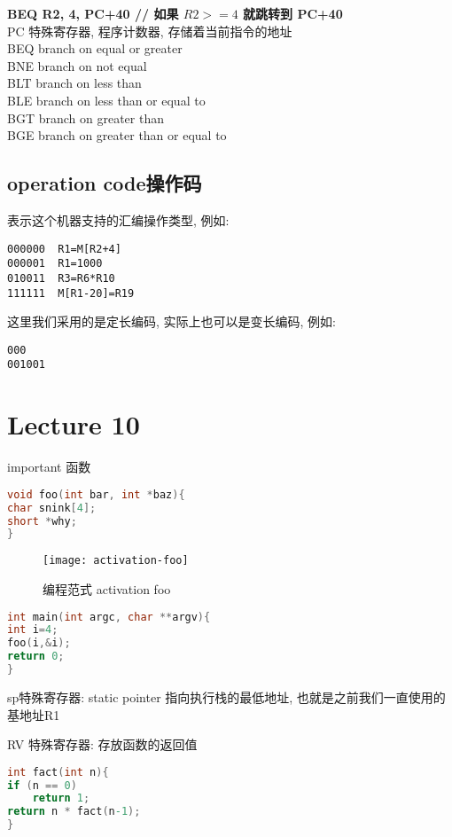 \documentclass{article}
\begin{document}
\bigskip\noindent
\textbf{BEQ R2, 4,  PC+40  // 如果 $R2 >=4$ 就跳转到 PC+40}\\
PC 特殊寄存器, 程序计数器, 存储着当前指令的地址\\
BEQ  branch on equal or greater\\
BNE branch on not equal\\
BLT branch on less than\\
BLE branch on less than or equal to\\
BGT branch on greater than\\
BGE branch on greater than or equal to\\

\subsection{operation code操作码}
表示这个机器支持的汇编操作类型,
例如:
\begin{verbatim}
000000	R1=M[R2+4]
000001	R1=1000
010011	R3=R6*R10
111111	M[R1-20]=R19
\end{verbatim}
这里我们采用的是定长编码,
实际上也可以是变长编码,
例如:
\begin{verbatim}
000
001001
\end{verbatim}

\section{Lecture 10} important
函数
\begin{lstlisting}[language = C]
void foo(int bar, int *baz){
char snink[4];
short *why;
}
\end{lstlisting}
\begin{figure}[htbp]
	\centering
	\texttt{[image: activation-foo]}\\
	\caption{编程范式 activation foo}\label{fig.activation.foo}
\end{figure}


\begin{lstlisting}[language = C]
int main(int argc, char **argv){
int i=4;
foo(i,&i);
return 0;
}
\end{lstlisting}

sp特殊寄存器:
static pointer 指向执行栈的最低地址, 也就是之前我们一直使用的基地址R1

RV 特殊寄存器:
存放函数的返回值

\begin{lstlisting}[language = C]
int fact(int n){
if (n == 0)
	return 1;
return n * fact(n-1);
}
\end{lstlisting}
\end{document}
